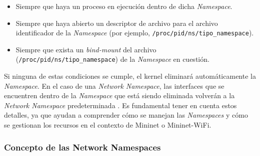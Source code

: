 \begin{itemize}
    \item Siempre que haya un proceso en ejecución dentro de dicha \textit{Namespace}.
    \item Siempre que haya abierto un descriptor de archivo para el archivo identificador de la \textit{Namespace} (por ejemplo, \texttt{/proc/{pid}/ns/{tipo\_namespace}}).
    \item Siempre que exista un \textit{bind-mount} del archivo (\texttt{/proc/{pid}/ns/{tipo\_namespace}}) de la \textit{Namespace} en cuestión.
\end{itemize}

Si ninguna de estas condiciones se cumple, el kernel eliminará automáticamente la \textit{Namespace}. En el caso de una \textit{Network Namespace}, las interfaces que se encuentren dentro de la \textit{Namespace} que está siendo eliminada volverán a la \textit{Network Namespace} predeterminada \cite{ns}. Es fundamental tener en cuenta estos detalles, ya que ayudan a comprender cómo se manejan las \textit{Namespaces} y cómo se gestionan los recursos en el contexto de Mininet o Mininet-WiFi.

\subsubsection{Concepto de las Network Namespaces}


